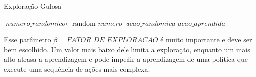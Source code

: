 \begin{algorithm}[H]
	\caption{Exploração Gulosa} \label{euclid}
	\begin{algorithmic}[1]
			\State $\textit{numero\_randomico} \gets \text{random }\textit{numero}$
				\State \Return $\textit{acao\_randomica}$
			\Else
				\State \Return $\textit{acao\_aprendida}$
			\EndIf
		\EndProcedure
	\end{algorithmic}
\end{algorithm}

Esse parâmetro $ \beta = \textit{FATOR\_DE\_EXPLORACAO} $ é muito importante e deve ser bem escolhido. Um valor mais baixo dele limita a exploração, enquanto um mais alto atrasa a aprendizagem e pode impedir a aprendizagem de uma política que execute uma sequência de ações mais complexa.
